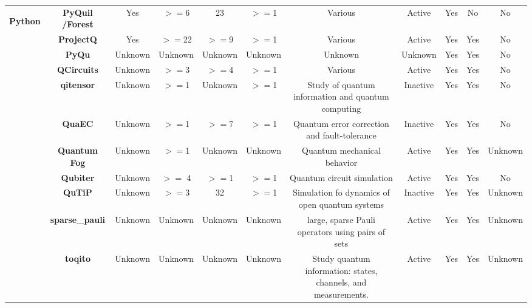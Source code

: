 \documentclass[conference]{IEEEtran}
\begin{document}
\begin{table*}[h!]
{\begin{tabular}{c|c|c|c|c|c|c|c|c|c|c}
    
        \multirow{11}{*}{\begin{sideways}\textbf{Python}\end{sideways}} & \textbf{PyQuil /Forest} & Yes   &$>=$6  & 23    &$>=$1  & Various & Active & Yes   & No    & No \\
               & \textbf{ProjectQ } & Yes   &$>=$22 &$>=$9  &$>=$1  & Various & Active & Yes   & Yes   & No \\
               & \textbf{PyQu } & Unknown & Unknown & Unknown & Unknown & Unknown & Unknown & Yes   & Yes   & No \\
               & \textbf{QCircuits } & Unknown &$>=$3  &$>=$4  &$>=$1  & Various & Active & Yes   & Yes   & No \\
               & \textbf{qitensor } & Unknown &$>=$1  & Unknown &$>=$1  & Study of quantum information and quantum computing & Inactive & Yes   & Yes   & No \\
               & \textbf{QuaEC } & Unknown &$>=$1  &$>=$7  &$>=$1  & Quantum error correction and fault-tolerance & Inactive & Yes   & Yes   & No \\
               & \textbf{Quantum Fog } & Unknown & $>=$1   & Unknown & Unknown & Quantum mechanical behavior & Active & Yes   & Yes   & Unknown \\
               & \textbf{Qubiter } & Unknown & $>=$ 4   &$>=$1  &$>=$1  & Quantum circuit simulation & Active & Yes   & Yes   & No \\
               & \textbf{QuTiP } & Unknown &$>=$3  & 32    &$>=$1  & Simulation fo dynamics of open quantum systems & Inactive & Yes   & Yes   & Unknown \\
               & \textbf{sparse\_pauli } & Unknown & Unknown & Unknown & Unknown & large, sparse Pauli operators using pairs of sets & Active & Yes   & Yes   & Unknown \\
               & \textbf{toqito } & Unknown & Unknown & Unknown & Unknown & Study quantum information: states, channels, and measurements. & Active & Yes   & Yes   & Unknown \\
    \hline
    
    
    

\end{tabular}}
\end{table*}
\end{document}
